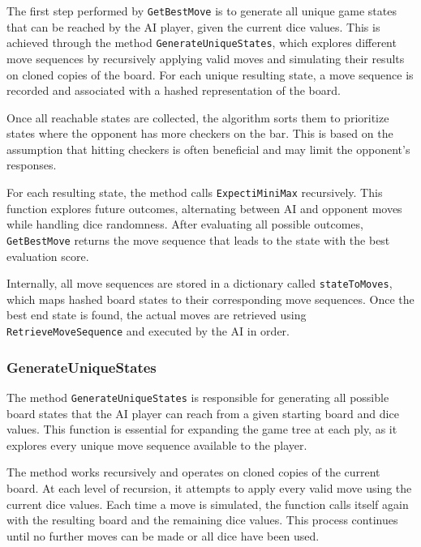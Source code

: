 The first step performed by \texttt{GetBestMove} is to generate all unique game states that can be reached by the AI player, given the current dice values. This is achieved through the method \texttt{GenerateUniqueStates}, which explores different move sequences by recursively applying valid moves and simulating their results on cloned copies of the board. For each unique resulting state, a move sequence is recorded and associated with a hashed representation of the board.

Once all reachable states are collected, the algorithm sorts them to prioritize states where the opponent has more checkers on the bar. This is based on the assumption that hitting checkers is often beneficial and may limit the opponent's responses.

For each resulting state, the method calls \texttt{ExpectiMiniMax} recursively. This function explores future outcomes, alternating between AI and opponent moves while handling dice randomness. After evaluating all possible outcomes, \texttt{GetBestMove} returns the move sequence that leads to the state with the best evaluation score.

Internally, all move sequences are stored in a dictionary called \texttt{stateToMoves}, which maps hashed board states to their corresponding move sequences. Once the best end state is found, the actual moves are retrieved using \texttt{RetrieveMoveSequence} and executed by the AI in order.

\subsubsection{GenerateUniqueStates}\label{GenerateStates}

The method \texttt{GenerateUniqueStates} is responsible for generating all possible board states that the AI player can reach from a given starting board and dice values. This function is essential for expanding the game tree at each ply, as it explores every unique move sequence available to the player.

The method works recursively and operates on cloned copies of the current board. At each level of recursion, it attempts to apply every valid move using the current dice values. Each time a move is simulated, the function calls itself again with the resulting board and the remaining dice values. This process continues until no further moves can be made or all dice have been used.

